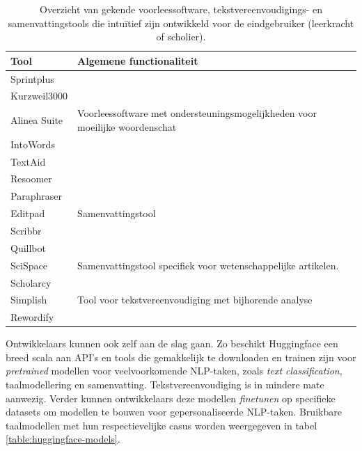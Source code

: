 \begin{center}
	\begin{table}[H]
		\begin{tabular}{ | m{4cm} | m{12cm} | } 
		\hline
		\textbf{Tool} & Algemene functionaliteit \\
		\hline
		Sprintplus & \\
		Kurzweil3000 & \\
		Alinea Suite & Voorleessoftware met ondersteuningsmogelijkheden voor moeilijke woordenschat \\
		IntoWords & \\
		TextAid & \\
		\hline
		Resoomer &  \\
		Paraphraser & \\
		Editpad & Samenvattingstool \\
		Scribbr & \\
		Quillbot & \\
		\hline
		SciSpace & Samenvattingstool specifiek voor wetenschappelijke artikelen. \\
		Scholarcy & \\
		\hline
		Simplish & Tool voor tekstvereenvoudiging met bijhorende analyse\\
		Rewordify & \\
		\hline
		\end{tabular}
	\caption{Overzicht van gekende voorleessoftware, tekstvereenvoudigings- en samenvattingstools die intuïtief zijn ontwikkeld voor de eindgebruiker (leerkracht of scholier).}
	\label{table:overview-tools}
	\end{table}
\end{center}

\medspace

Ontwikkelaars kunnen ook zelf aan de slag gaan. Zo beschikt Huggingface een breed scala aan API's en tools die gemakkelijk te downloaden en trainen zijn voor \textit{pretrained} modellen voor veelvoorkomende NLP-taken, zoals \textit{text classification}, taalmodellering en samenvatting. Tekstvereenvoudiging is in mindere mate aanwezig. Verder kunnen ontwikkelaars deze modellen \textit{finetunen} op specifieke datasets om modellen te bouwen voor gepersonaliseerde NLP-taken. Bruikbare taalmodellen met hun respectievelijke casus worden weergegeven in tabel \ref{table:huggingface-models}.

\medspace

